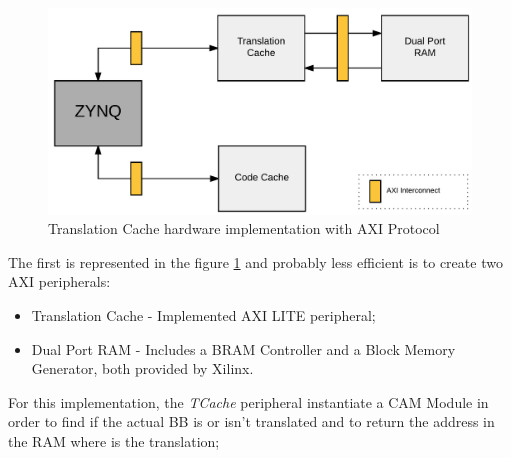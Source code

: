 \begin{figure} [H]
	\centering
	\includegraphics[scale = 0.2]{images/DesignHw1.png}
	\caption{Translation Cache hardware implementation with AXI Protocol}
	\label{fig:TCache_Hw}
\end{figure}

The first is represented in the figure \ref{fig:TCache_Hw} and probably less efficient is to create two AXI peripherals:
\begin{itemize}
	\item Translation Cache - Implemented AXI LITE peripheral;
	\item Dual Port RAM - Includes a BRAM Controller and a Block Memory Generator, both provided by Xilinx.	
\end{itemize}

For this implementation, the \textit{TCache} peripheral instantiate a CAM Module in order to find if the actual BB is or isn't translated and to return the address in the RAM where is the translation;